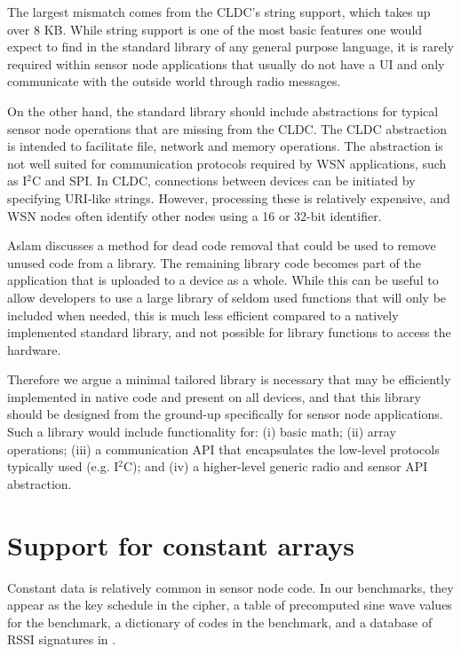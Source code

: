 The largest mismatch comes from the CLDC's string support, which takes up over 8 KB. While string support is one of the most basic features one would expect to find in the standard library of any general purpose language, it is rarely required within sensor node applications that usually do not have a UI and only communicate with the outside world through radio messages.

On the other hand, the standard library should include abstractions for typical sensor node operations that are missing from the CLDC. The CLDC  abstraction is intended to facilitate file, network and memory operations. The abstraction is not well suited for communication protocols required by WSN applications, such as I$^{2}$C and SPI. In CLDC, connections between devices can be initiated by specifying URI-like strings. However, processing these is relatively expensive, and WSN nodes often identify other nodes using a 16 or 32-bit identifier.

Aslam \cite{Aslam:2011thesis} discusses a method for dead code removal that could be used to remove unused code from a library. The remaining library code becomes part of the application that is uploaded to a device as a whole. While this can be useful to allow developers to use a large library of seldom used functions that will only be included when needed, this is much less efficient compared to a natively implemented standard library, and not possible for library functions to access the hardware.

Therefore we argue a minimal tailored library is necessary that may be efficiently implemented in native code and present on all devices, and that this library should be designed from the ground-up specifically for sensor node applications. Such a library would include functionality for: (i) basic math; (ii) array operations; (iii) a communication API that encapsulates the low-level protocols typically used (e.g. I$^{2}$C); and (iv) a higher-level generic radio and sensor API abstraction.






\section{Support for constant arrays}
\label{sec-const-data}
Constant data is relatively common in sensor node code. In our benchmarks, they appear as the key schedule in the  cipher, a table of precomputed sine wave values for the  benchmark, a dictionary of codes in the  benchmark, and a database of RSSI signatures in .

